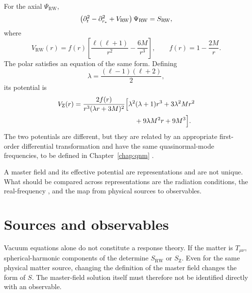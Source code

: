For the axial  $\Psi_{\mathrm{RW}}$,
\begin{equation}
\left(
\partial_t^2-\partial_{r_*}^2+V_{\mathrm{RW}}
\right)\Psi_{\mathrm{RW}}
=
S_{\mathrm{RW}},
\label{eq:rw-master}
\end{equation}
where
\begin{equation}
V_{\mathrm{RW}}(r)
=
f(r)
\left[
\frac{\ell(\ell+1)}{r^2}
-\frac{6M}{r^3}
\right],
\qquad
f(r)=1-\frac{2M}{r}.
\label{eq:rw-potential}
\end{equation}
The polar  satisfies an equation of the same form. Defining
\begin{equation}
\lambda
=
\frac{(\ell-1)(\ell+2)}{2},
\end{equation}
its potential is
\begin{align}
V_{\mathrm Z}(r)
&=
\frac{2f(r)}{r^3(\lambda r+3M)^2}
\Bigl[
\lambda^2(\lambda+1)r^3
+3\lambda^2Mr^2
\nonumber\\
&\hspace{9em}
+9\lambda M^2r
+9M^3
\Bigr].
\label{eq:zerilli-potential-minimum}
\end{align}
The two potentials are different, but they are related by an appropriate first-order differential transformation and have the same quasinormal-mode frequencies, to be defined in Chapter~\ref{chap:qnm} \cite{Chandrasekhar:book,Chandrasekhar:1975nkd}.

\begin{principlebox}
A master field and its effective potential are representations and are not unique. What should be compared across representations are the radiation conditions, the real-frequency , and the map from physical sources to observables.
\end{principlebox}

\section{Sources and observables}

Vacuum equations alone do not constitute a response theory. If the matter  is $T_{\mu\nu}$, spherical-harmonic components of the  determine $S_{\mathrm{RW}}$ or $S_{\mathrm Z}$. Even for the same physical matter source, changing the definition of the master field changes the form of $S$. The master-field solution itself must therefore not be identified directly with an observable.

